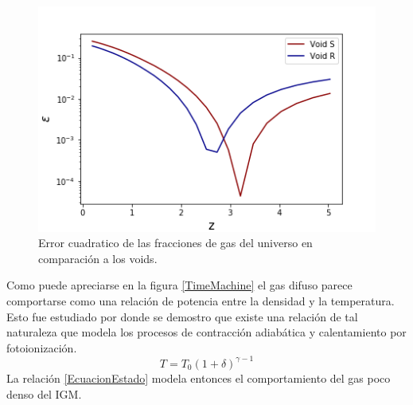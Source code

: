 \begin{figure}
    \centering
    \includegraphics[width=12cm]{Figures/TimeMachine_error.png}
    \caption{Error cuadratico de las fracciones de gas del universo en comparaci\'on a los voids. }
    \label{Error}
\end{figure}{}

Como puede apreciarse en la figura \ref{TimeMachine} el gas difuso parece comportarse como una relaci\'on de potencia entre la densidad y la temperatura. Esto fue estudiado por \citep{Hui1997} donde se demostro que existe una relaci\'on de tal naturaleza que modela los procesos de contracci\'on adiab\'atica y calentamiento por fotoionizaci\'on. 
\begin{equation}
    T=T_{0}(1+\delta)^{\gamma-1}
    \label{EcuacionEstado}
\end{equation}{}
La relaci\'on \ref{EcuacionEstado} modela entonces el comportamiento del gas poco denso del IGM. 





